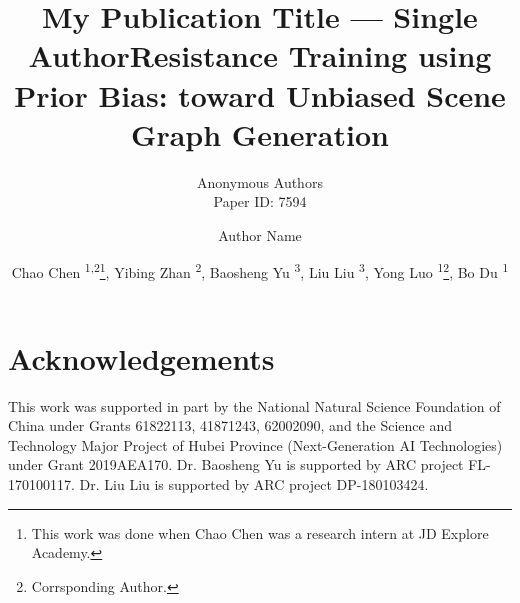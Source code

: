 \documentclass[letterpaper]{article} %
\author{
Anonymous Authors\\
Paper ID: 7594
}
\author{
}
\title{My Publication Title --- Single Author}
\author {
	Author Name
}
\title{Resistance Training using Prior Bias: toward Unbiased Scene Graph Generation}
\author {
	Chao Chen \textsuperscript{\rm 1,2}\footnote{This work was done when Chao Chen was a research intern at JD Explore Academy.},
	Yibing Zhan \textsuperscript{\rm 2}, 
	Baosheng Yu \textsuperscript{\rm 3}, 
	Liu Liu \textsuperscript{\rm 3}, 
	Yong Luo \textsuperscript{\rm 1}\footnote{Corrsponding Author.}, 
	Bo Du \textsuperscript{\rm 1}\footnotemark[2]
}
\begin{document}
\maketitle








%

\section*{Acknowledgements}
This work was supported in part by the National Natural Science Foundation of China under Grants 61822113, 41871243, 62002090, and the Science and Technology Major Project of Hubei Province (Next-Generation AI Technologies) under Grant 2019AEA170.
Dr. Baosheng Yu is supported by ARC project FL-170100117.
Dr. Liu Liu is supported by ARC project DP-180103424.


\end{document}

